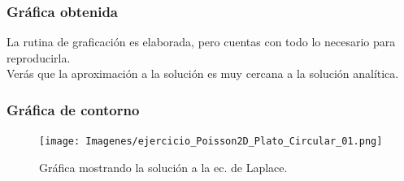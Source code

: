 \begin{frame}
\frametitle{Gráfica obtenida}
La rutina de graficación es elaborada, pero cuentas con todo lo necesario para reproducirla.
\\
\bigskip
\pause
Verás que la aproximación a la solución es muy cercana a la solución analítica.
\end{frame}
\begin{frame}
\frametitle{Gráfica de contorno}
\begin{figure}[h!]
   \centering
   \texttt{[image: Imagenes/ejercicio\_Poisson2D\_Plato\_Circular\_01.png]}  
   \caption{Gráfica mostrando la solución a la ec. de Laplace.}
\end{figure}
\end{frame}

